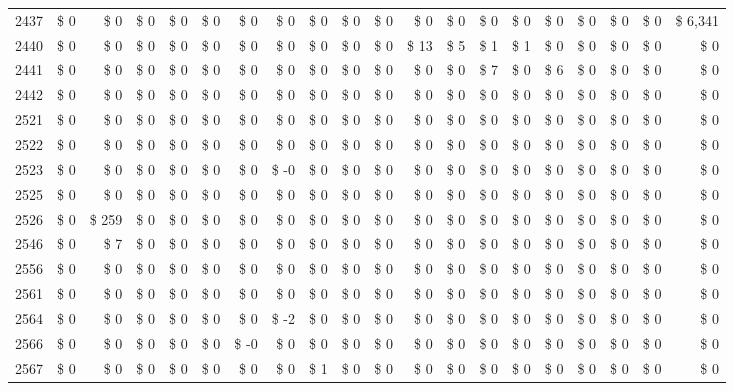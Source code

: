 \begin{longtable}{lrrrrrrrrrrrrrrrrrrr}
2437 & \$ 0 & \$ 0 & \$ 0 & \$ 0 & \$ 0 & \$ 0 & \$ 0 & \$ 0 & \$ 0 & \$ 0 & \$ 0 & \$ 0 & \$ 0 & \$ 0 & \$ 0 & \$ 0 & \$ 0 & \$ 0 & \$ 6,341 \\
2440 & \$ 0 & \$ 0 & \$ 0 & \$ 0 & \$ 0 & \$ 0 & \$ 0 & \$ 0 & \$ 0 & \$ 0 & \$ 13 & \$ 5 & \$ 1 & \$ 1 & \$ 0 & \$ 0 & \$ 0 & \$ 0 & \$ 0 \\
2441 & \$ 0 & \$ 0 & \$ 0 & \$ 0 & \$ 0 & \$ 0 & \$ 0 & \$ 0 & \$ 0 & \$ 0 & \$ 0 & \$ 0 & \$ 7 & \$ 0 & \$ 6 & \$ 0 & \$ 0 & \$ 0 & \$ 0 \\
2442 & \$ 0 & \$ 0 & \$ 0 & \$ 0 & \$ 0 & \$ 0 & \$ 0 & \$ 0 & \$ 0 & \$ 0 & \$ 0 & \$ 0 & \$ 0 & \$ 0 & \$ 0 & \$ 0 & \$ 0 & \$ 0 & \$ 0 \\
2521 & \$ 0 & \$ 0 & \$ 0 & \$ 0 & \$ 0 & \$ 0 & \$ 0 & \$ 0 & \$ 0 & \$ 0 & \$ 0 & \$ 0 & \$ 0 & \$ 0 & \$ 0 & \$ 0 & \$ 0 & \$ 0 & \$ 0 \\
2522 & \$ 0 & \$ 0 & \$ 0 & \$ 0 & \$ 0 & \$ 0 & \$ 0 & \$ 0 & \$ 0 & \$ 0 & \$ 0 & \$ 0 & \$ 0 & \$ 0 & \$ 0 & \$ 0 & \$ 0 & \$ 0 & \$ 0 \\
2523 & \$ 0 & \$ 0 & \$ 0 & \$ 0 & \$ 0 & \$ 0 & \$ -0 & \$ 0 & \$ 0 & \$ 0 & \$ 0 & \$ 0 & \$ 0 & \$ 0 & \$ 0 & \$ 0 & \$ 0 & \$ 0 & \$ 0 \\
2525 & \$ 0 & \$ 0 & \$ 0 & \$ 0 & \$ 0 & \$ 0 & \$ 0 & \$ 0 & \$ 0 & \$ 0 & \$ 0 & \$ 0 & \$ 0 & \$ 0 & \$ 0 & \$ 0 & \$ 0 & \$ 0 & \$ 0 \\
2526 & \$ 0 & \$ 259 & \$ 0 & \$ 0 & \$ 0 & \$ 0 & \$ 0 & \$ 0 & \$ 0 & \$ 0 & \$ 0 & \$ 0 & \$ 0 & \$ 0 & \$ 0 & \$ 0 & \$ 0 & \$ 0 & \$ 0 \\
2546 & \$ 0 & \$ 7 & \$ 0 & \$ 0 & \$ 0 & \$ 0 & \$ 0 & \$ 0 & \$ 0 & \$ 0 & \$ 0 & \$ 0 & \$ 0 & \$ 0 & \$ 0 & \$ 0 & \$ 0 & \$ 0 & \$ 0 \\
2556 & \$ 0 & \$ 0 & \$ 0 & \$ 0 & \$ 0 & \$ 0 & \$ 0 & \$ 0 & \$ 0 & \$ 0 & \$ 0 & \$ 0 & \$ 0 & \$ 0 & \$ 0 & \$ 0 & \$ 0 & \$ 0 & \$ 0 \\
2561 & \$ 0 & \$ 0 & \$ 0 & \$ 0 & \$ 0 & \$ 0 & \$ 0 & \$ 0 & \$ 0 & \$ 0 & \$ 0 & \$ 0 & \$ 0 & \$ 0 & \$ 0 & \$ 0 & \$ 0 & \$ 0 & \$ 0 \\
2564 & \$ 0 & \$ 0 & \$ 0 & \$ 0 & \$ 0 & \$ 0 & \$ -2 & \$ 0 & \$ 0 & \$ 0 & \$ 0 & \$ 0 & \$ 0 & \$ 0 & \$ 0 & \$ 0 & \$ 0 & \$ 0 & \$ 0 \\
2566 & \$ 0 & \$ 0 & \$ 0 & \$ 0 & \$ 0 & \$ -0 & \$ 0 & \$ 0 & \$ 0 & \$ 0 & \$ 0 & \$ 0 & \$ 0 & \$ 0 & \$ 0 & \$ 0 & \$ 0 & \$ 0 & \$ 0 \\
2567 & \$ 0 & \$ 0 & \$ 0 & \$ 0 & \$ 0 & \$ 0 & \$ 0 & \$ 1 & \$ 0 & \$ 0 & \$ 0 & \$ 0 & \$ 0 & \$ 0 & \$ 0 & \$ 0 & \$ 0 & \$ 0 & \$ 0 \\

\end{longtable}
